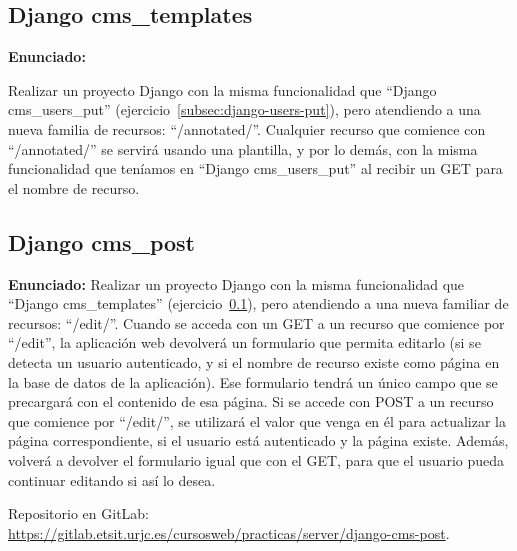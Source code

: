 \subsection{Django cms\_templates}
\label{subsec:django-templates}

\textbf{Enunciado:}

Realizar un proyecto Django con la misma funcionalidad que ``Django cms\_users\_put'' (ejercicio~\ref{subsec:django-users-put}), pero atendiendo a una nueva familia de recursos: ``/annotated/''. Cualquier recurso que comience con ``/annotated/'' se servirá usando una plantilla, y por lo demás, con la misma funcionalidad que teníamos en ``Django cms\_users\_put'' al recibir un GET para el nombre de recurso.


\subsection{Django cms\_post}
\label{subsec:django-post}

\textbf{Enunciado:}
 Realizar un proyecto Django con la misma funcionalidad que ``Django cms\_templates'' (ejercicio~\ref{subsec:django-templates}), pero atendiendo a una nueva familiar de recursos: ``/edit/''. Cuando se acceda con un GET a un recurso que comience por ``/edit'', la aplicación web devolverá un formulario que permita editarlo (si se detecta un usuario autenticado, y si el nombre de recurso existe como página en la base de datos de la aplicación). Ese formulario tendrá un único campo que se precargará con el contenido de esa página. Si se accede con POST a un recurso que comience por ``/edit/'', se utilizará el valor que venga en él para actualizar la página correspondiente, si el usuario está autenticado y la página existe. Además, volverá a devolver el formulario igual que con el GET, para que el usuario pueda continuar editando si así lo desea.
 
Repositorio en GitLab: \\
\url{https://gitlab.etsit.urjc.es/cursosweb/practicas/server/django-cms-post}.

